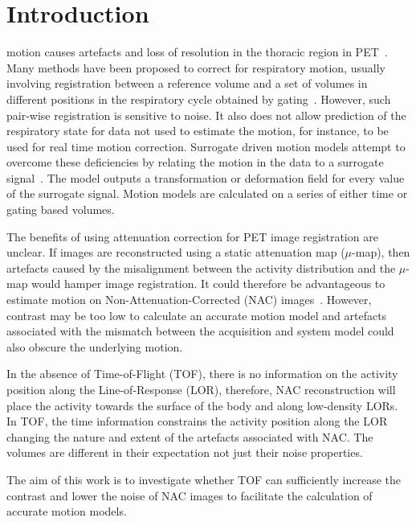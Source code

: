 \documentclass{IEEEtran}
\begin{document}
\vspace{-0.4cm}

\section{Introduction}
 motion causes artefacts and loss of resolution in the thoracic region in PET~\cite{Nehmeh2008}. Many methods have been proposed to correct for respiratory motion, usually involving registration between a reference volume and a set of volumes in different positions in the respiratory cycle obtained by gating~\cite{Oliveira2014}. However, such pair-wise registration is sensitive to noise. It also does not allow prediction of the respiratory state for data not used to estimate the motion, for instance, to be used for real time motion correction. Surrogate driven motion models attempt to overcome these deficiencies by relating the motion in the data to a surrogate signal~\cite{McClelland2013}. The model outputs a transformation or deformation field for every value of the surrogate signal. Motion models are calculated on a series of either time or gating based volumes.

The benefits of using attenuation correction for PET image registration are unclear. If images are reconstructed using a static attenuation map ($\mu$-map), then artefacts caused by the misalignment between the activity distribution and the $\mu$-map would hamper image registration. It could therefore be advantageous to estimate motion on Non-Attenuation-Corrected (NAC) images~\cite{WenjiaBai2011}. However, contrast may be too low to calculate an accurate motion model and artefacts associated with the mismatch between the acquisition and system model could also obscure the underlying motion. 

In the absence of Time-of-Flight (TOF), there is no information on the activity position along the Line-of-Response (LOR), therefore, NAC reconstruction will place the activity towards the surface of the body and along low-density LORs. In TOF, the time information constrains the activity position along the LOR changing the nature and extent of the artefacts associated with NAC. The volumes are different in their expectation not just their noise properties.

The aim of this work is to investigate whether TOF can sufficiently increase the contrast and lower the noise of NAC images to facilitate the calculation of accurate motion models.

\vspace{-0.2cm}
\end{document}
